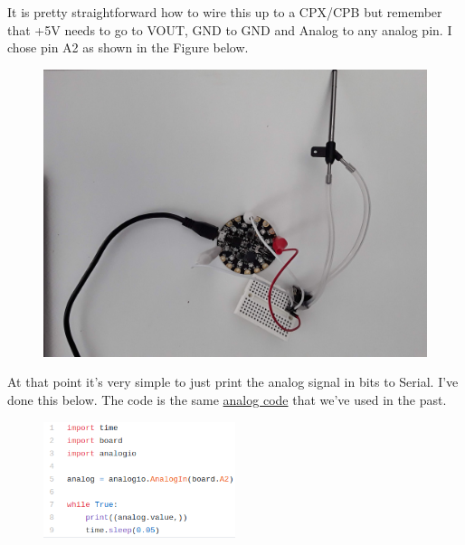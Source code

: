  It is pretty straightforward how to wire this up to a CPX/CPB but remember that +5V needs to go to VOUT, GND to GND and Analog to any analog pin. I chose pin A2 as shown in the Figure below. 
\begin{figure}[H]
  \begin{center}
    \includegraphics[width=\textwidth]{Figures/pitot_probe_circuit.jpeg}
  \end{center}
\end{figure}
At that point it’s very simple to just print the analog signal in bits to Serial. I’ve done this below. The code is the same \href{https://github.com/cmontalvo251/Microcontrollers/blob/master/Circuit_Playground/CircuitPython/Analog/analog_simple.py}{analog code} that we’ve used in the past.
\begin{figure}[H]
  \begin{center}
    \includegraphics[width=0.5\textwidth]{Figures/analogio.png}
  \end{center}
\end{figure}
